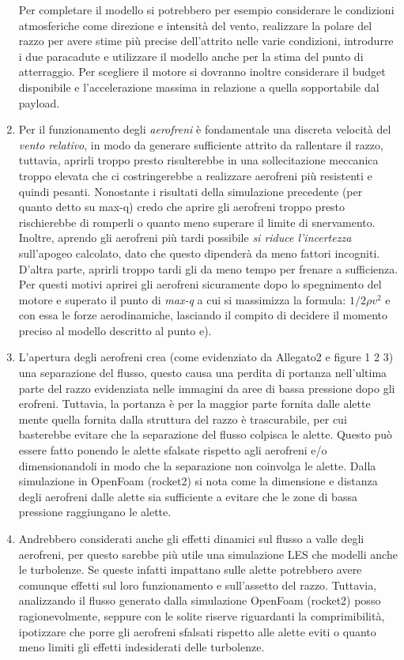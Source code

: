 \documentclass[11pt, a4paper]{article}
\begin{document}
\begin{enumerate}
Per completare il modello si potrebbero per esempio considerare le condizioni atmosferiche come direzione e intensità del vento, realizzare la polare del razzo per avere stime più precise dell'attrito nelle varie condizioni, introdurre i due paracadute e utilizzare il modello anche per la stima del punto di atterraggio.
Per scegliere il motore si dovranno inoltre considerare il budget disponibile e l'accelerazione massima in relazione a quella sopportabile dal payload.
\item Per il funzionamento degli \emph{aerofreni} è fondamentale una discreta velocità del \emph{vento relativo}, in modo da generare sufficiente attrito da rallentare il razzo, tuttavia, aprirli troppo presto risulterebbe in una sollecitazione meccanica troppo elevata che ci costringerebbe a realizzare aerofreni più resistenti e quindi pesanti. Nonostante i risultati della simulazione precedente (per quanto detto su max-q) credo che aprire gli aerofreni troppo presto rischierebbe di romperli o quanto meno superare il limite di snervamento. Inoltre, aprendo gli aerofreni più tardi possibile \emph{si riduce l'incertezza} sull'apogeo calcolato, dato che questo dipenderà da meno fattori incogniti. D'altra parte, aprirli troppo tardi gli da meno tempo per frenare a sufficienza. Per questi motivi aprirei gli aerofreni sicuramente dopo lo spegnimento del motore e superato il punto di \emph{max-q} a cui si massimizza la formula: \begin{math} 1/2\rho v^2\end{math} e con essa le forze aerodinamiche, lasciando il compito di decidere il momento preciso al modello descritto al punto e).
\item L'apertura degli aerofreni crea (come evidenziato da Allegato2 e figure 1 2 3) una separazione del flusso, questo causa una perdita di portanza nell'ultima parte del razzo evidenziata nelle immagini da aree di bassa pressione dopo gli erofreni. Tuttavia, la portanza è per la maggior parte fornita dalle alette mente quella fornita dalla struttura del razzo è trascurabile, per cui basterebbe evitare che la separazione del flusso colpisca le alette. Questo può essere fatto ponendo le alette sfalsate rispetto agli aerofreni e/o dimensionandoli in modo che la separazione non coinvolga le alette. Dalla simulazione in OpenFoam (rocket2) si nota come la dimensione e distanza degli aerofreni dalle alette sia sufficiente a evitare che le zone di bassa pressione raggiungano le alette.
\item Andrebbero considerati anche gli effetti dinamici sul flusso a valle degli aerofreni, per questo sarebbe più utile una simulazione LES che modelli anche le turbolenze. Se queste infatti impattano sulle alette potrebbero avere comunque effetti sul loro funzionamento e sull'assetto del razzo. Tuttavia, analizzando il flusso generato dalla simulazione OpenFoam (rocket2) posso ragionevolmente, seppure con le solite riserve riguardanti la comprimibilità, ipotizzare che porre gli aerofreni sfalsati rispetto alle alette eviti o quanto meno limiti gli effetti indesiderati delle turbolenze.

\end{enumerate}
\end{document}
